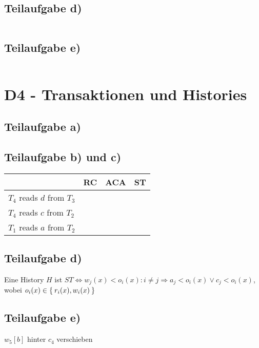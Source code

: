 \documentclass[a4paper]{scrartcl}
\newcommand{\cmark}{\ding{51}}%
\begin{document}
\subsection{Teilaufgabe d)}
\inputminted[linenos, numbersep=5pt, tabsize=4]{sql}{d3d.sql}

\subsection{Teilaufgabe e)}
\inputminted[linenos, numbersep=5pt, tabsize=4]{sql}{d3e.sql}

\section{D4 - Transaktionen und Histories}
\subsection{Teilaufgabe a)}

\subsection{Teilaufgabe b) und c)}
    \begin{tabular}{l|lll}
    ~                          & RC     & ACA    & ST     \\ \hline
    $T_4$ reads $d$ from $T_3$ & \cmark & \cmark & \cmark \\
    $T_4$ reads $c$ from $T_2$ & \cmark & \cmark & \cmark \\
    $T_1$ reads $a$ from $T_2$ & \cmark & \cmark & \cmark \\
    \end{tabular}

\subsection{Teilaufgabe d)}
Eine History $H$ ist $ST \Leftrightarrow w_j(x) < o_i(x): i \neq j \Rightarrow a_j < o_i(x) \lor c_j < o_i(x)$, wobei $o_i(x) \in \Set{r_i(x), w_i(x)}$

\subsection{Teilaufgabe e)}
$w_5[b]$ hinter $c_4$ verschieben
\end{document}
